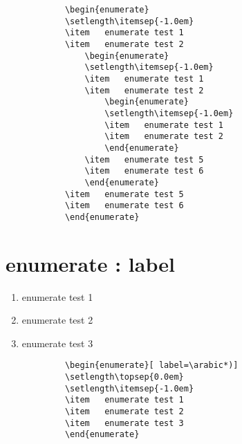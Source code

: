\documentclass[12pt, a4paper, oneside]{book}
\let\stdsection\section
\renewcommand\section{\newpage\stdsection}
\begin{document}
		\begin{mdframed}[style=code_document, frametitle={code}]
			\begin{verbatim}
			\begin{enumerate}
			\setlength\itemsep{-1.0em}
			\item	enumerate test 1
			\item	enumerate test 2
				\begin{enumerate}
				\setlength\itemsep{-1.0em}
				\item	enumerate test 1
				\item	enumerate test 2
					\begin{enumerate}
					\setlength\itemsep{-1.0em}
					\item	enumerate test 1
					\item	enumerate test 2
					\end{enumerate}
				\item	enumerate test 5
				\item	enumerate test 6
				\end{enumerate}
			\item	enumerate test 5
			\item	enumerate test 6
			\end{enumerate}
			\end{verbatim}
		\end{mdframed}


	\section{enumerate : label}
			\begin{enumerate}[ label=\arabic*)]
			\setlength\topsep{0.0em}
			\setlength\itemsep{-1.0em}
			\item	enumerate test 1
			\item	enumerate test 2
			\item	enumerate test 3
			\end{enumerate}

		\begin{mdframed}[style=code_document, frametitle={code}]
			\begin{verbatim}
			\begin{enumerate}[ label=\arabic*)]
			\setlength\topsep{0.0em}
			\setlength\itemsep{-1.0em}
			\item	enumerate test 1
			\item	enumerate test 2
			\item	enumerate test 3
			\end{enumerate}
			\end{verbatim}
		\end{mdframed}
\end{document}
